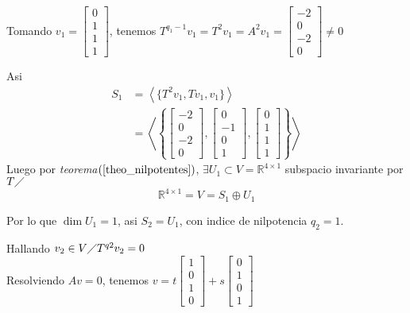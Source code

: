 \documentclass[10pt,a4paper]{article}
\begin{document}
Tomando $v_{1} = 
\begin{bmatrix}
	0	\\
	1	\\
	1	\\
	1
\end{bmatrix}
$, tenemos $T^{q_{1}-1}v_{1} = T^{2}v_{1} = A^{2}v_{1} = 
\begin{bmatrix}
	-2	\\
	0	\\
	-2	\\
	0
\end{bmatrix}\neq 0
$

Asi \begin{align*}
	S_{1} 	&= \left<\{T^{2}v_{1}, Tv_{1}, v_{1}\}\right>\\
			&=\left<\left\{
			\begin{bmatrix}
			-2	\\
			0	\\
			-2	\\
			0
			\end{bmatrix}, 
			\begin{bmatrix}
			0	\\
			-1	\\
			0	\\
			1
			\end{bmatrix},
			\begin{bmatrix}
			0	\\
			1	\\
			1	\\
			1
			\end{bmatrix}\right\}\right>
\end{align*}
Luego por \textit{teorema}$(\ref{theo_nilpotentes})$, $\exists U_{1}\subset V = \mathbb{R}^{4\times 1}$ subspacio invariante por $T\diagup$
$$\mathbb{R}^{4\times 1} = V = S_{1}\oplus U_{1}$$

Por lo que $\dim U_{1} = 1$, asi $S_{2} = U_{1}$, con indice de nilpotencia $q_{2} = 1$.

Hallando $v_{2}\in V\diagup T^{q2}v_{2} = 0$\\
Resolviendo $Av = 0$, tenemos 
$v = t
\begin{bmatrix}
1	\\
0	\\
1	\\
0
\end{bmatrix}
+ s
\begin{bmatrix}
0	\\
1	\\
0	\\
1
\end{bmatrix}$
\end{document}
